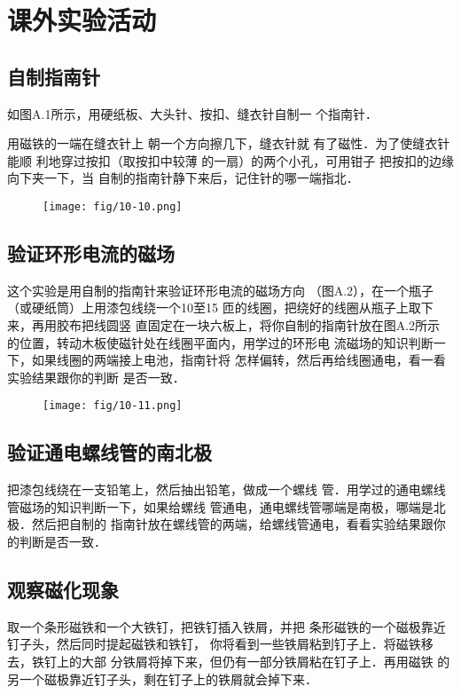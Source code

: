 
\chapter{课外实验活动}
\section{自制指南针}
如图A.1所示，用硬纸板、大头针、按扣、缝衣针自制一
个指南针．

用磁铁的一端在缝衣针上
朝一个方向擦几下，缝衣针就
有了磁性．为了使缝衣针能顺
利地穿过按扣（取按扣中较薄
的一扇）的两个小孔，可用钳子
把按扣的边缘向下夹一下，当
自制的指南针静下来后，记住针的哪一端指北．

\begin{figure}[htp]\centering
    \texttt{[image: fig/10-10.png]}
    \caption{}
    \end{figure}


\section{验证环形电流的磁场}
这个实验是用自制的指南针来验证环形电流的磁场方向
（图A.2），在一个瓶子（或硬纸筒）上用漆包线绕一个10至15
匝的线圈，把绕好的线圈从瓶子上取下来，再用胶布把线圆竖
直固定在一块六板上，将你自制的指南针放在图A.2所示
的位置，转动木板使磁针处在线圈平面内，用学过的环形电
流磁场的知识判断一下，如果线圈的两端接上电池，指南针将
怎样偏转，然后再给线圈通电，看一看实验结果跟你的判断
是否一致．
\begin{figure}[htp]\centering
    \texttt{[image: fig/10-11.png]}
    \caption{}
    \end{figure}

    \section{验证通电螺线管的南北极}
把漆包线绕在一支铅笔上，然后抽出铅笔，做成一个螺线
管．用学过的通电螺线管磁场的知识判断一下，如果给螺线
管通电，通电螺线管哪端是南极，哪端是北极．然后把自制的
指南针放在螺线管的两端，给螺线管通电，看看实验结果跟你
的判断是否一致．

\section{观察磁化现象}
取一个条形磁铁和一个大铁钉，把铁钉插入铁屑，并把
条形磁铁的一个磁极靠近钉子头，然后同时提起磁铁和铁钉，
你将看到一些铁屑粘到钉子上．将磁铁移去，铁钉上的大部
分铁屑将掉下来，但仍有一部分铁屑粘在钉子上．再用磁铁
的另一个磁极靠近钉子头，剩在钉子上的铁屑就会掉下来．


